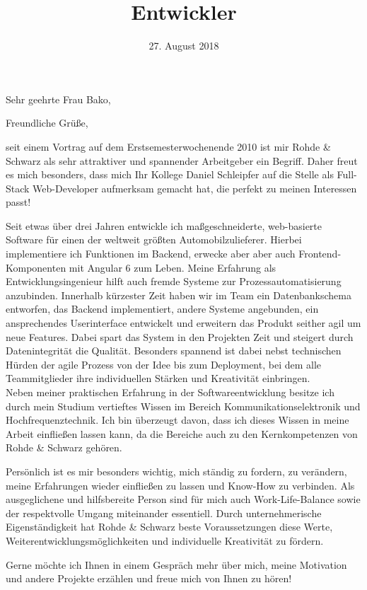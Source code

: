 \documentclass[11pt,a4paper,sans]{moderncv}        %
\title{Entwickler}                   %
\begin{document}
\date{27. August 2018}
\opening{Sehr geehrte Frau Bako,}
\closing{Freundliche Grü\ss e,}
\makelettertitle

seit einem Vortrag auf dem Erstsemesterwochenende 2010 ist mir Rohde \& Schwarz als sehr attraktiver und spannender Arbeitgeber ein Begriff. Daher freut es mich besonders, dass mich Ihr Kollege Daniel Schleipfer auf die Stelle als Full-Stack Web-Developer aufmerksam gemacht hat, die perfekt zu meinen Interessen passt! 

Seit etwas über drei Jahren entwickle ich ma\ss geschneiderte, web-basierte Software für einen der weltweit grö\ss ten Automobilzulieferer. Hierbei implementiere ich Funktionen im Backend, erwecke aber aber auch Frontend-Komponenten mit Angular 6 zum Leben. Meine Erfahrung als Entwicklungsingenieur hilft auch fremde Systeme zur Prozessautomatisierung anzubinden. Innerhalb kürzester Zeit haben wir im Team ein Datenbankschema entworfen, das Backend implementiert, andere Systeme angebunden, ein ansprechendes Userinterface entwickelt und erweitern das Produkt seither agil um neue Features. Dabei spart das System in den Projekten Zeit und steigert durch Datenintegrität die Qualität. Besonders spannend ist dabei nebst technischen Hürden der agile Prozess von der Idee bis zum Deployment, bei dem alle Teammitglieder ihre individuellen Stärken und Kreativität einbringen.\\
Neben meiner praktischen Erfahrung in der Softwareentwicklung besitze ich durch mein Studium vertieftes Wissen im Bereich Kommunikationselektronik und Hochfrequenztechnik. Ich bin überzeugt davon, dass ich dieses Wissen in meine Arbeit einflie\ss en lassen kann, da die Bereiche auch zu den Kernkompetenzen von Rohde \& Schwarz gehören.

Persönlich ist es mir besonders wichtig, mich ständig zu fordern, zu verändern, meine Erfahrungen wieder einflie\ss en zu lassen und Know-How zu verbinden. Als ausgeglichene und hilfsbereite Person sind für mich auch Work-Life-Balance sowie der respektvolle Umgang miteinander essentiell. Durch unternehmerische Eigenständigkeit hat Rohde \& Schwarz beste Voraussetzungen diese Werte, Weiterentwicklungsmöglichkeiten und individuelle Kreativität zu fördern.

Gerne möchte ich Ihnen in einem Gespräch mehr über mich, meine Motivation und andere Projekte erzählen und freue mich von Ihnen zu hören!


\makeletterclosing
\end{document}

